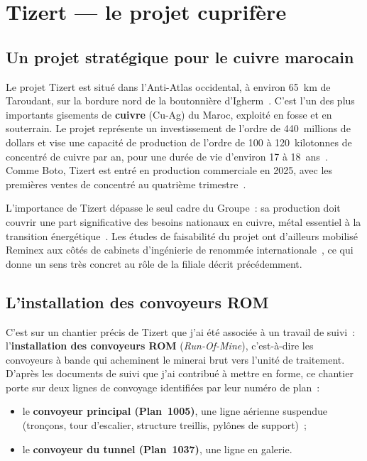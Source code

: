 \documentclass[12pt,a4paper,oneside]{report}
\begin{document}
\section{Tizert --- le projet cuprifère}

\subsection{Un projet stratégique pour le cuivre marocain}

Le projet Tizert est situé dans l'Anti-Atlas occidental, à environ 65~km de Taroudant, sur la bordure nord de la boutonnière d'Igherm~\cite{managem_tizert}. C'est l'un des plus importants gisements de \textbf{cuivre} (Cu-Ag) du Maroc, exploité en fosse et en souterrain. Le projet représente un investissement de l'ordre de 440~millions de dollars et vise une capacité de production de l'ordre de 100 à 120~kilotonnes de concentré de cuivre par an, pour une durée de vie d'environ 17 à 18~ans~\cite{managem_tizert}. Comme Boto, Tizert est entré en production commerciale en 2025, avec les premières ventes de concentré au quatrième trimestre~\cite{managem_tizert}.

L'importance de Tizert dépasse le seul cadre du Groupe~: sa production doit couvrir une part significative des besoins nationaux en cuivre, métal essentiel à la transition énergétique~\cite{managem_tizert}. Les études de faisabilité du projet ont d'ailleurs mobilisé Reminex aux côtés de cabinets d'ingénierie de renommée internationale~\cite{managem_tizert}, ce qui donne un sens très concret au rôle de la filiale décrit précédemment.

\subsection{L'installation des convoyeurs ROM}

C'est sur un chantier précis de Tizert que j'ai été associée à un travail de suivi~: l'\textbf{installation des convoyeurs ROM} (\textit{Run-Of-Mine}), c'est-à-dire les convoyeurs à bande qui acheminent le minerai brut vers l'unité de traitement. D'après les documents de suivi que j'ai contribué à mettre en forme, ce chantier porte sur deux lignes de convoyage identifiées par leur numéro de plan~:

\begin{itemize}
\item le \textbf{convoyeur principal (Plan~1005)}, une ligne aérienne suspendue (tronçons, tour d'escalier, structure treillis, pylônes de support)~;
\item le \textbf{convoyeur du tunnel (Plan~1037)}, une ligne en galerie.
\end{itemize}
\end{document}
